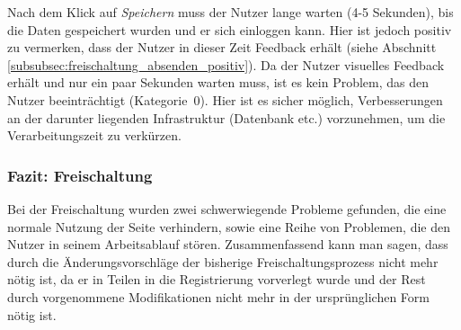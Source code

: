 {
Nach dem Klick auf \emph{Speichern} muss der Nutzer lange warten (4-5 Sekunden), bis die Daten gespeichert wurden und er sich einloggen kann. Hier ist jedoch positiv zu vermerken, dass der Nutzer in dieser Zeit Feedback erhält (siehe Abschnitt \ref{subsubsec:freischaltung_absenden_positiv}).
}
{
Da der Nutzer visuelles Feedback erhält und nur ein paar Sekunden warten muss, ist es kein Problem, das den Nutzer beeinträchtigt (Kategorie~0).
}
{
Hier ist es sicher möglich, Verbesserungen an der darunter liegenden Infrastruktur (Datenbank etc.) vorzunehmen, um die Verarbeitungszeit zu verkürzen.
}
\label{prob:frei:speichern}

\subsubsection*{Fazit: Freischaltung}
Bei der Freischaltung wurden zwei schwerwiegende Probleme gefunden, die eine normale Nutzung der Seite verhindern, sowie eine Reihe von Problemen, die den Nutzer in seinem Arbeitsablauf stören. Zusammenfassend kann man sagen, dass durch die Änderungsvorschläge der bisherige Freischaltungsprozess nicht mehr nötig ist, da er in Teilen in die Registrierung vorverlegt wurde und der Rest durch vorgenommene Modifikationen nicht mehr in der ursprünglichen Form nötig ist.

